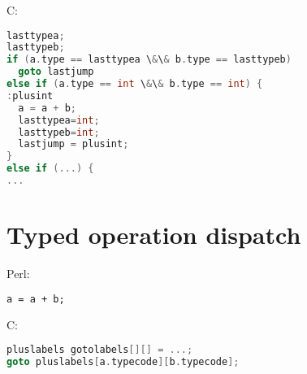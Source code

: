 \documentclass[11pt,a4paper]{report}
\begin{document}
C:
\begin{lstlisting}[language=C]
lasttypea;
lasttypeb;
if (a.type == lasttypea \&\& b.type == lasttypeb)
  goto lastjump
else if (a.type == int \&\& b.type == int) {
:plusint
  a = a + b;
  lasttypea=int;
  lasttypeb=int;
  lastjump = plusint;
}
else if (...) {	
...
\end{lstlisting}

\section{Typed operation dispatch}


Perl:
\begin{lstlisting}[language=perl]
a = a + b;
\end{lstlisting}

C:
\begin{lstlisting}[language=C]
pluslabels gotolabels[][] = ...;
goto pluslabels[a.typecode][b.typecode];
\end{lstlisting}
\end{document}
